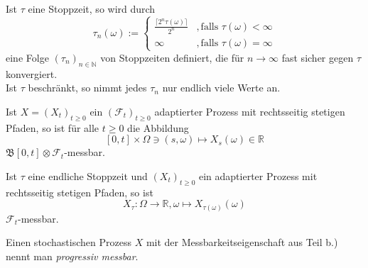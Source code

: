\documentclass[a4paper,twoside,DIV15,BCOR12mm]{scrbook}
\newcommand{\cF}{\mathcal F}
\newcommand{\borel}{{\mathfrak B}}
\begin{document}
\begin{lemma}
\label{lemma:13.1}
  \begin{enuma}
  \item Ist $\tau$ eine Stoppzeit, so wird durch
\[
\tau_n(\omega):=\left\{\begin{array}{cc}\frac{\lceil2^n\tau(\omega)\rceil}{2^n} &,\text{falls } \tau(\omega)<\infty \\ \infty &,\text{falls } \tau(\omega)=\infty\end{array}\right.
\]
eine Folge $(\tau_n)_{n\in\mathbb N}$ von Stoppzeiten definiert, die für $n\to\infty$ fast sicher gegen $\tau$ konvergiert. \\
Ist $\tau$ beschränkt, so nimmt jedes $\tau_n$ nur endlich viele Werte an.
\item Ist $X=(X_t)_{t\geq0}$ ein $(\cF_t)_{t\geq0}$ adaptierter Prozess mit rechtsseitig stetigen Pfaden, so ist für alle $t\geq0$ die Abbildung
\[
[0,t]\times\Omega\ni(s,\omega)\mapsto X_s(\omega)\in\mathbb R
\]
$\borel[0,t]\otimes\cF_t$-messbar.
\item Ist $\tau$ eine endliche Stoppzeit und $(X_t)_{t\geq0}$ ein adaptierter Prozess mit rechtsseitig stetigen Pfaden, so ist
\[
X_\tau:\Omega\longrightarrow\mathbb R, \omega\mapsto X_{\tau(\omega)}(\omega)
\]
$\cF_t$-messbar.
  \end{enuma}
\end{lemma}
\begin{bemerkung}
  Einen stochastischen Prozess $X$ mit der Messbarkeitseigenschaft aus Teil b.) nennt man \emph{progressiv messbar}.
\end{bemerkung}
\end{document}
